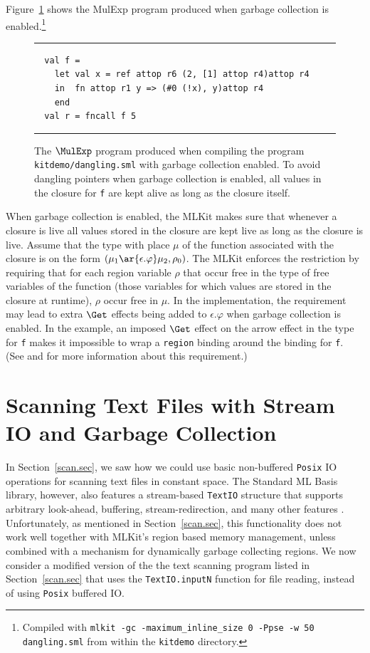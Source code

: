 \documentclass[12pt]{book}
\begin{document}
Figure~\ref{dangling_gc.fig} shows the MulExp program produced when
garbage collection is enabled.\footnote{Compiled with {\tt mlkit -gc
    -maximum\_inline\_size 0 -Ppse -w 50 dangling.sml} from within the
  {\tt kitdemo} directory.}
\begin{figure}[ht]
\hrule \medskip
\begin{verbatim}
  val f =
    let val x = ref attop r6 (2, [1] attop r4)attop r4
    in  fn attop r1 y => (#0 (!x), y)attop r4
    end
  val r = fncall f 5
\end{verbatim}
\caption{The $\MulExp$ program produced when compiling the program
  {\tt kitdemo/dangling.sml} with garbage collection enabled. To avoid
  dangling pointers when garbage collection is enabled, all values in
  the closure for {\tt f} are kept alive as long as the closure
  itself.}  \medskip \hrule
\label{dangling_gc.fig}
\end{figure}
When garbage collection is enabled, the MLKit makes sure that whenever
a closure is live all values stored in the closure are kept live as
long as the closure is live.  Assume that the type with place $\mu$ of
the function associated with the closure is on the form $(\mu_1
\ar{\epsilon.\varphi} \mu_2, \rho_0)$.  The MLKit enforces the
restriction by requiring that for each region variable $\rho$ that
occur free in the type of free variables of the function (those
variables for which values are stored in the closure at runtime),
$\rho$ occur free in $\mu$. In the implementation, the requirement may
lead to extra $\Get$ effects being added to $\epsilon.\varphi$ when
garbage collection is enabled. In the example, an imposed $\Get$
effect on the arrow effect in the type for {\tt f} makes it impossible
to wrap a {\tt region} binding around the binding for {\tt f}. (See
\cite[page 50]{total93} and \cite{elsman:tldi03} for more information
about this requirement.)

\section{Scanning Text Files with Stream IO and Garbage Collection}

In Section~\ref{scan.sec}, we saw how we could use basic non-buffered
\texttt{Posix} IO operations for scanning text files in constant
space. The Standard ML Basis library, however, also features a
stream-based \texttt{TextIO} structure that supports arbitrary
look-ahead, buffering, stream-redirection, and many other features
\cite{basislib2004}. Unfortunately, as mentioned in
Section~\ref{scan.sec}, this functionality does not work well together
with MLKit's region based memory management, unless combined with a
mechanism for dynamically garbage collecting regions. We now consider
a modified version of the the text scanning program listed in
Section~\ref{scan.sec} that uses the \texttt{TextIO.inputN} function
for file reading, instead of using \texttt{Posix} buffered IO.
\end{document}
